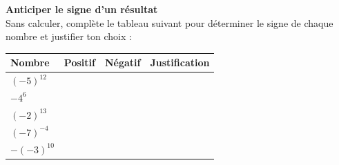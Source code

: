 \documentclass[a4paper]{book}
\begin{document}
    \begin{exercice} \textbf{Anticiper le signe d'un résultat} \\
        Sans calculer, complète le tableau suivant pour déterminer le signe de chaque nombre et justifier ton choix :
        
        \begin{center}
        {\renewcommand{\arraystretch}{1.5} 
        \begin{tabularx}{\textwidth}{|p{2.5cm}|>{\centering\arraybackslash}p{1.5cm}|>{\centering\arraybackslash}p{1.5cm}|X|}
            \hline
            \rowcolor{gray!20} \textbf{Nombre} & \textbf{Positif} & \textbf{Négatif} & \textbf{Justification} \\ \hline
            $(-5)^{12}$ & & & \\ \hline
            $-4^{6}$    & & & \\ \hline
            $(-2)^{13}$ & & & \\ \hline
            $(-7)^{-4}$ & & & \\ \hline
            $-(-3)^{10}$& & & \\ \hline
        \end{tabularx}}
        \end{center}
    \end{exercice}
    
    \vspace{0.3cm}
    
\end{document}
